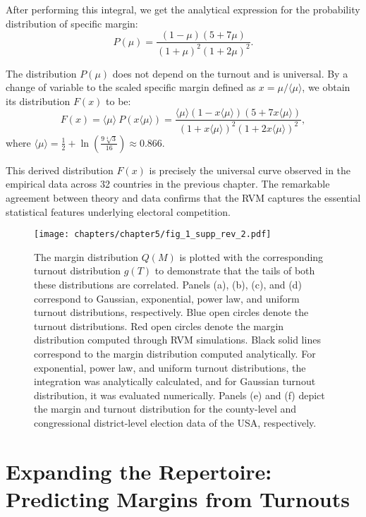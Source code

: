 After performing this integral, we get the analytical expression for the probability distribution of specific margin:
\begin{equation}
    P(\mu) = \frac{(1 - \mu)(5 + 7\mu)}{(1 + \mu)^2(1 + 2\mu)^2}.
    \label{eq:P_mu}
\end{equation}

The distribution $P(\mu)$ does not depend on the turnout and is universal. By a change of variable to the scaled specific margin defined as $x = \mu / \langle \mu \rangle$, we obtain its distribution $F(x)$ to be:
\begin{equation}
    F\left(x\right) = \langle \mu \rangle ~ P\left( x \langle \mu \rangle \right) =  \frac{\langle \mu \rangle(1 - x \langle \mu \rangle)(5 + 7x \langle \mu \rangle)}{(1 + x \langle \mu \rangle)^2(1 + 2x \langle \mu \rangle)^2}, 
\end{equation}
where $\langle \mu\rangle = \frac{1}{2}+\ln \left(\frac{9 \sqrt[4]{3}}{16}\right) \approx 0.866$.

This derived distribution $F(x)$ is precisely the universal curve observed in the empirical data across 32 countries in the previous chapter. The remarkable agreement between theory and data confirms that the RVM captures the essential statistical features underlying electoral competition.

\begin{figure}[h]
    \centering
    \texttt{[image: chapters/chapter5/fig\_1\_supp\_rev\_2.pdf]}
    \caption{The margin distribution $Q(M)$ is plotted with the corresponding turnout distribution $g(T)$ to demonstrate that the tails of both these distributions are correlated. Panels (a), (b), (c), and (d) correspond to Gaussian, exponential, power law, and uniform turnout distributions, respectively. Blue open circles denote the turnout distributions. Red open circles denote the margin distribution computed through RVM simulations. Black solid lines correspond to the margin distribution computed analytically. For exponential, power law, and uniform turnout distributions, the integration was analytically calculated, and for Gaussian turnout distribution, it was evaluated numerically. Panels (e) and (f) depict the margin and turnout distribution for the county-level and congressional district-level election data of the USA, respectively.}
    \label{fig:sup_1}
\end{figure}

\section{Expanding the Repertoire: Predicting Margins from Turnouts}

